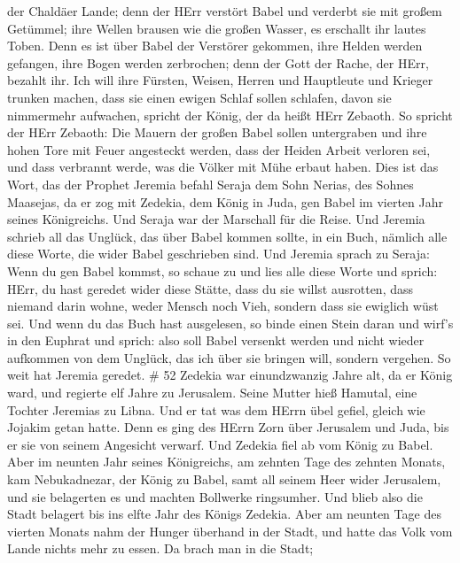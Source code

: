 der Chaldäer Lande;  denn der HErr verstört Babel und
verderbt sie mit großem Getümmel; ihre Wellen brausen wie die großen
Wasser, es erschallt ihr lautes Toben.  Denn es ist über
Babel der Verstörer gekommen, ihre Helden werden gefangen, ihre Bogen
werden zerbrochen; denn der Gott der Rache, der HErr, bezahlt ihr.
 Ich will ihre Fürsten, Weisen, Herren und Hauptleute und
Krieger trunken machen, dass sie einen ewigen Schlaf sollen schlafen,
davon sie nimmermehr aufwachen, spricht der König, der da heißt HErr
Zebaoth.  So spricht der HErr Zebaoth: Die Mauern der
großen Babel sollen untergraben und ihre hohen Tore mit Feuer angesteckt
werden, dass der Heiden Arbeit verloren sei, und dass verbrannt werde,
was die Völker mit Mühe erbaut haben.  Dies ist das Wort,
das der Prophet Jeremia befahl Seraja dem Sohn Nerias, des Sohnes
Maasejas, da er zog mit Zedekia, dem König in Juda, gen Babel im vierten
Jahr seines Königreichs. Und Seraja war der Marschall für die Reise.
 Und Jeremia schrieb all das Unglück, das über Babel kommen
sollte, in ein Buch, nämlich alle diese Worte, die wider Babel
geschrieben sind.  Und Jeremia sprach zu Seraja: Wenn du
gen Babel kommst, so schaue zu und lies alle diese Worte 
und sprich: HErr, du hast geredet wider diese Stätte, dass du sie willst
ausrotten, dass niemand darin wohne, weder Mensch noch Vieh, sondern
dass sie ewiglich wüst sei.  Und wenn du das Buch hast
ausgelesen, so binde einen Stein daran und wirf's in den Euphrat
 und sprich: also soll Babel versenkt werden und nicht
wieder aufkommen von dem Unglück, das ich über sie bringen will, sondern
vergehen. So weit hat Jeremia geredet. \# 52  Zedekia war
einundzwanzig Jahre alt, da er König ward, und regierte elf Jahre zu
Jerusalem. Seine Mutter hieß Hamutal, eine Tochter Jeremias zu Libna.
 Und er tat was dem HErrn übel gefiel, gleich wie Jojakim
getan hatte.  Denn es ging des HErrn Zorn über Jerusalem und
Juda, bis er sie von seinem Angesicht verwarf. Und Zedekia fiel ab vom
König zu Babel.  Aber im neunten Jahr seines Königreichs, am
zehnten Tage des zehnten Monats, kam Nebukadnezar, der König zu Babel,
samt all seinem Heer wider Jerusalem, und sie belagerten es und machten
Bollwerke ringsumher.  Und blieb also die Stadt belagert bis
ins elfte Jahr des Königs Zedekia.  Aber am neunten Tage des
vierten Monats nahm der Hunger überhand in der Stadt, und hatte das Volk
vom Lande nichts mehr zu essen.  Da brach man in die Stadt;
